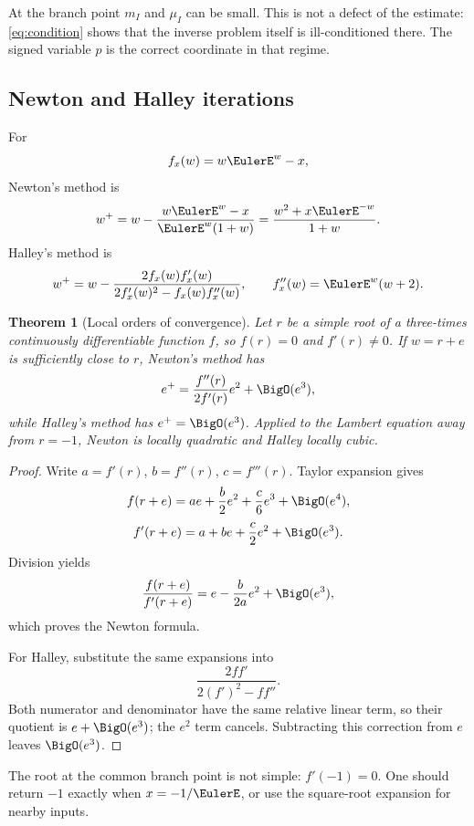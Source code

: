 \documentclass[11pt]{article}
\newtheorem{theorem}{Theorem}[section]
\theoremstyle{remark}
\begin{document}
At the branch point \(m_I\) and \(\mu_I\) can be small.  This is not a
defect of the estimate: \cref{eq:condition} shows that the inverse problem
itself is ill-conditioned there.  The signed variable \(p\) is the correct
coordinate in that regime.

\subsection{Newton and Halley iterations}

For
\[
       f_x(w)=w\EulerE^w-x,
\]
Newton's method is
\begin{equation}\label{eq:newton-original}
 w^+
 =w-\frac{w\EulerE^w-x}{\EulerE^w(1+w)}
 =\frac{w^2+x\EulerE^{-w}}{1+w}.
\end{equation}
Halley's method is
\begin{equation}\label{eq:halley}
 w^+
 =w-\frac{2f_x(w)f_x'(w)}
          {2f_x'(w)^2-f_x(w)f_x''(w)},
 \qquad
 f_x''(w)=\EulerE^w(w+2).
\end{equation}

\begin{theorem}[Local orders of convergence]\label{thm:newton-halley-orders}
Let \(r\) be a simple root of a three-times continuously differentiable
function \(f\), so \(f(r)=0\) and \(f'(r)\neq0\).  If \(w=r+e\) is
sufficiently close to \(r\), Newton's method has
\[
       e^+=\frac{f''(r)}{2f'(r)}e^2+\BigO(e^3),
\]
while Halley's method has \(e^+=\BigO(e^3)\).  Applied to the Lambert
equation away from \(r=-1\), Newton is locally quadratic and Halley locally
cubic.
\end{theorem}

\begin{proof}
Write \(a=f'(r)\), \(b=f''(r)\), \(c=f'''(r)\).  Taylor expansion gives
\[
 f(r+e)=ae+\frac b2e^2+\frac c6e^3+\BigO(e^4),
\]
\[
 f'(r+e)=a+be+\frac c2e^2+\BigO(e^3).
\]
Division yields
\[
       \frac{f(r+e)}{f'(r+e)}
       =e-\frac{b}{2a}e^2+\BigO(e^3),
\]
which proves the Newton formula.

For Halley, substitute the same expansions into
\[
       \frac{2ff'}{2(f')^2-ff''}.
\]
Both numerator and denominator have the same relative linear term, so their
quotient is \(e+\BigO(e^3)\); the \(e^2\) term cancels.  Subtracting this
correction from \(e\) leaves \(\BigO(e^3)\).
\end{proof}

The root at the common branch point is not simple:
\(f'(-1)=0\).  One should return \(-1\) exactly when \(x=-1/\EulerE\), or use
the square-root expansion for nearby inputs.
\end{document}
